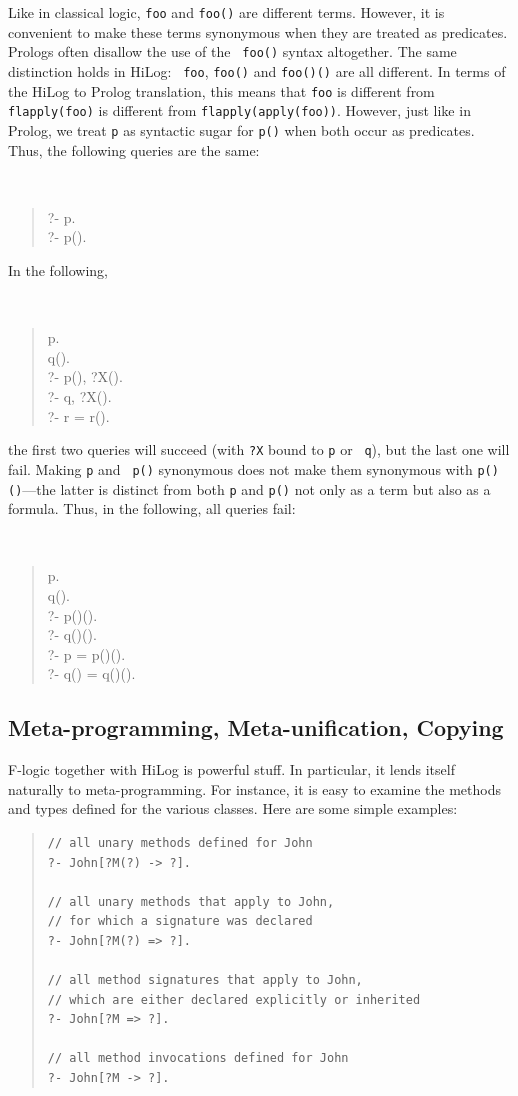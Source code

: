 \documentclass[11pt]{article}
\newcommand{\fl}{\mbox{F-logic}\xspace}
\begin{document}
%
Like in classical logic, {\tt foo} and {\tt foo()} are different terms.
However, it is convenient to make these terms synonymous
when they
are treated as predicates. Prologs often disallow the use of the {\tt
  foo()} syntax altogether.  The same distinction holds in HiLog: {\tt
  foo}, {\tt foo()} and {\tt foo()()} are all different. In terms of the
HiLog to Prolog translation, this means that {\tt foo} is different from
{\tt flapply(foo)} is different from {\tt flapply(apply(foo))}.  However, just
like in Prolog, we treat {\tt p} as syntactic sugar for {\tt p()} when both
occur as predicates. Thus, the following queries are the same:
{\tt
\begin{quote}
  ?- p.\\
  ?- p().
\end{quote}
}
\noindent
In the following,
{\tt
\begin{quote}
 p. \\
 q().\\
 ?- p(), ?X().\\
 ?- q, ?X().\\
 ?- r = r().
\end{quote}
}
\noindent
the first two queries will succeed (with {\tt ?X} bound to {\tt p} or {\tt
  q}), but the last one will fail.  Making {\tt p} and {\tt
  p()} synonymous does not make them synonymous with {\tt p()()}---the
latter is distinct from both {\tt p}
and {\tt p()} not only as a term but also as a formula. Thus, in the
following, all queries fail:
{\tt
\begin{quote}
 p.\\
 q().\\
 ?- p()().\\
 ?- q()().\\
 ?- p = p()().\\
 ?- q() = q()().
\end{quote}
}


\subsection{Meta-programming, Meta-unification, Copying}
\label{sec-meta-reification}


%
\fl together with HiLog is powerful stuff. In particular, it lends itself
naturally to meta-programming. For instance, it is easy to examine the
methods and types defined for the various classes.  Here are some simple
examples:
\begin{quote}
\begin{verbatim}
// all unary methods defined for John
?- John[?M(?) -> ?].

// all unary methods that apply to John,
// for which a signature was declared
?- John[?M(?) => ?].

// all method signatures that apply to John,
// which are either declared explicitly or inherited
?- John[?M => ?].

// all method invocations defined for John
?- John[?M -> ?].
\end{verbatim}
\end{quote}
\end{document}
